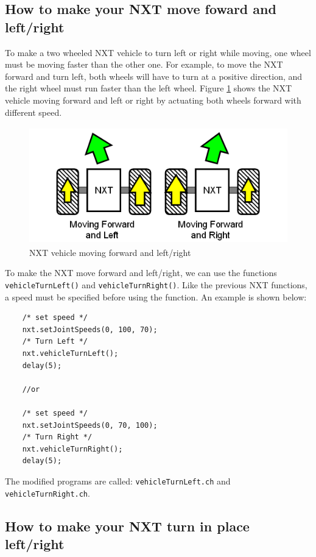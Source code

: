 \subsection{How to make your NXT move foward and left/right}
To make a two wheeled NXT vehicle to turn left or right while moving, one wheel must be moving 
faster than the other one.  For example, to move the NXT forward and turn left, both wheels will 
have to turn at a positive direction, and the right wheel must run faster than the left wheel. 
Figure \ref{fig_NXT_leftright} shows the NXT vehicle moving forward and left or right by actuating
both wheels forward with different speed.\\

\begin{figure}[h]
  \begin{center}
    \includegraphics[height=2in]{figure/mindstorm/Vehicle_LR.png}
    \caption{NXT vehicle moving forward and left/right \label{fig_NXT_leftright}}
  \end{center}
\end{figure}

\noindent
To make the NXT move forward and left/right, we can use the functions \verb+vehicleTurnLeft()+ 
and \verb+vehicleTurnRight()+. Like the previous NXT functions, a speed must be specified before 
using the function.  An example is shown below:
\begin{verbatim}
    /* set speed */
    nxt.setJointSpeeds(0, 100, 70);
    /* Turn Left */ 
    nxt.vehicleTurnLeft();
    delay(5);
    
    //or
    
    /* set speed */
    nxt.setJointSpeeds(0, 70, 100);
    /* Turn Right */
    nxt.vehicleTurnRight();
    delay(5);
\end{verbatim}
The modified programs are called: \verb+vehicleTurnLeft.ch+ and \verb+vehicleTurnRight.ch+.

\subsection{How to make your NXT turn in place left/right}

